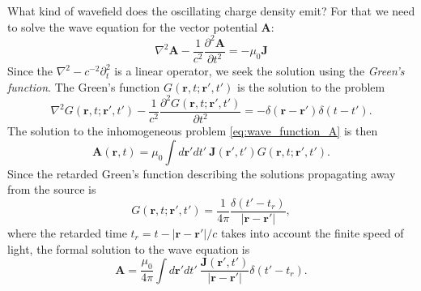 What kind of wavefield does the oscillating charge density emit? For that we need to solve the 
wave equation for the vector potential $\mathbf{A}$:
\begin{equation}\label{eq:wave_function_A}
\nabla^2 \mathbf{A} - \frac{1}{c^2}\frac{\partial^2 \mathbf{A}}{\partial t^2} = -\mu_0 \mathbf{J}
\end{equation}
Since the $\nabla^2 - c^{-2} \partial^2_t$ is a linear operator, we seek the solution using the \emph{Green's function}. The Green's function $G(\mathbf{r},t;\mathbf{r}',t')$ is the solution to the problem 
\begin{equation}
\nabla^2  G(\mathbf{r},t;\mathbf{r}',t') - \frac{1}{c^2}\frac{\partial^2 G(\mathbf{r},t;\mathbf{r}',t')}{\partial t^2} = - \delta(\mathbf{r}-\mathbf{r}')
\delta(t-t').
\end{equation}
The solution to the inhomogeneous problem \eqref{eq:wave_function_A} is then
\begin{equation}
\mathbf{A}(\mathbf{r},t) = \mu_0 \int d\mathbf{r}' dt' \   \mathbf{J}(\mathbf{r}',t') G(\mathbf{r},t;\mathbf{r}',t').
\end{equation}
Since the retarded Green's function describing the solutions propagating away from the source is 
\begin{equation}
G(\mathbf{r},t;\mathbf{r}',t') = \frac{1}{4 \pi} \frac{\delta(t'-t_r)}{|\mathbf{r}-\mathbf{r}'|},
\end{equation}
where the retarded time $t_r = t - |\mathbf{r}-\mathbf{r}'|/c$ takes into account the finite speed of light, 
the formal solution to the wave equation is 
\begin{equation}
\mathbf{A} = \frac{\mu_0}{4 \pi}\int d\mathbf{r}' dt' \  \frac{\mathbf{J}(\mathbf{r}',t')}{|\mathbf{r}-\mathbf{r}'|} \delta(t'-t_r).\label{eq:oscillating_A}
\end{equation}
